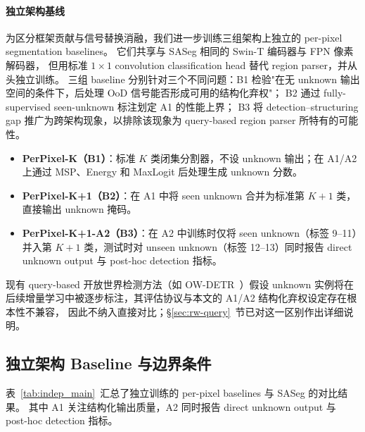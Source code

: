 \documentclass[3p,twocolumn,authoryear]{elsarticle}
\begin{document}
\paragraph{独立架构基线}
为区分框架贡献与信号替换消融，我们进一步训练三组架构上独立的 per-pixel segmentation baselines。
它们共享与 SASeg 相同的 Swin-T 编码器与 FPN 像素解码器，
但用标准 $1 \times 1$ convolution classification head 替代 region parser，并从头独立训练。
三组 baseline 分别针对三个不同问题：B1 检验"在无 unknown 输出空间的条件下，后处理 OoD 信号能否形成可用的结构化弃权"；
B2 通过 fully-supervised seen-unknown 标注划定 A1 的性能上界；
B3 将 detection--structuring gap 推广为跨架构现象，以排除该现象为 query-based region parser 所特有的可能性。
\begin{itemize}[nosep]
  \item \textbf{PerPixel-K（B1）}：标准 $K$ 类闭集分割器，不设 unknown 输出；在 A1/A2 上通过 MSP、Energy 和 MaxLogit 后处理生成 unknown 分数。
  \item \textbf{PerPixel-K+1（B2）}：在 A1 中将 seen unknown 合并为标准第 $K+1$ 类，直接输出 unknown 掩码。
  \item \textbf{PerPixel-K+1-A2（B3）}：在 A2 中训练时仅将 seen unknown（标签 9--11）并入第 $K+1$ 类，测试时对 unseen unknown（标签 12--13）同时报告 direct unknown output 与 post-hoc detection 指标。
\end{itemize}
现有 query-based 开放世界检测方法（如 OW-DETR~\cite{gupta2021owdetr}）假设 unknown 实例将在后续增量学习中被逐步标注，其评估协议与本文的 A1/A2 结构化弃权设定存在根本性不兼容，
因此不纳入直接对比；§\ref{sec:rw-query}~节已对这一区别作出详细说明。

\subsection{独立架构 Baseline 与边界条件}\label{sec:exp:indep}

表~\ref{tab:indep_main}~汇总了独立训练的 per-pixel baselines 与 SASeg 的对比结果。
其中 A1 关注结构化输出质量，A2 同时报告 direct unknown output 与 post-hoc detection 指标。
\end{document}
